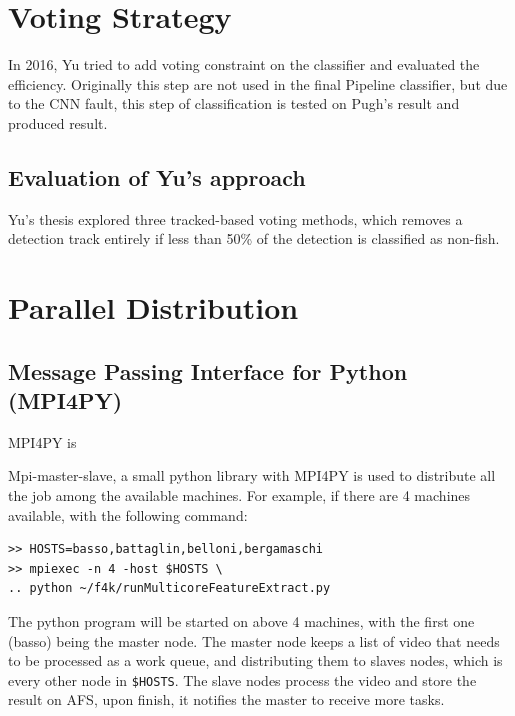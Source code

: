 \documentclass[bsc,logo,twoside,fullspacing,parskip]{infthesis}
\begin{document}
\chapter{Voting Strategy}
\label{chap:voting}

In 2016, Yu tried to add voting constraint on the classifier and evaluated the efficiency. Originally this step are not used in the final Pipeline classifier, but due to the CNN fault, this step of classification is tested on Pugh's result and produced \underline{\hspace{40pt}} result. %

\section{Evaluation of Yu's approach}

Yu's thesis explored three tracked-based voting methods, which removes a detection track entirely if less than 50\% of the detection is classified as non-fish.

\chapter{Parallel Distribution}
\label{chap:parallel}

\section{Message Passing Interface for Python (MPI4PY)}

MPI4PY is

Mpi-master-slave, a small python library with MPI4PY is used to distribute all the job among the available machines. 
For example, if there are 4 machines available, with the following command: 
\lstset{basicstyle=\footnotesize\ttfamily,breaklines=true}
\begin{lstlisting}[frame=single]
>> HOSTS=basso,battaglin,belloni,bergamaschi
>> mpiexec -n 4 -host $HOSTS \
.. python ~/f4k/runMulticoreFeatureExtract.py
\end{lstlisting}
The python program will be started on above 4 machines, with the first one (basso) being the master node.
The master node keeps a list of video that needs to be processed as a work queue, and distributing them to slaves nodes, which is every other node in {\tt \$HOSTS}. 
The slave nodes process the video and store the result on AFS, upon finish, it notifies the master to receive more tasks.

\end{document}
